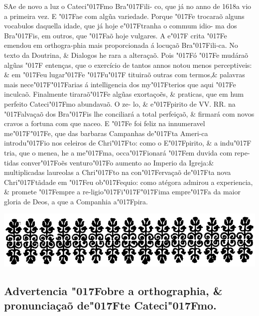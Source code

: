 \documentclass[openany,titlepage,12pt]{book}
\newcommand{\lgS}{\char"017F}
\newcommand{\lgSS}{\char"017F\char"017F}
\begin{document}
\lettrine[findent=2pt, nindent=0pt, lines=2]
{S}{A}e de novo a luz o Cateci\lgS mo Bra\lgS ili-\linebreak
co, que já no anno de 1618a vio a primeira vez. E \lgS ae
com algũa variedade. Porque \lgS e trocaraõ alguns vocabulos 
daquella idade, que já hoje e\lgS tranha o commum idio-
ma dos Bra\lgS is, em outros, que \lgS aõ hoje vulgares. A e\lgS 
crita \lgS e emendou em orthogra-phia mais proporcionada á 
locuçaõ Bra\lgS ili-ca. No texto da Doutrina, \& Dialogos he
rara a alteraçaõ. Pois \lgS ó \lgS e mudáraõ algũas \lgS 
entenças, que o exercício de tantos annos notou menos 
perceptiveis: \& em \lgS eu lugar\linebreak \lgS e \lgS u\lgS  
tituiraõ outras com termos,\& palavras mais nece\lgSS arias 
á intelligencia dos my\lgS terios que aqui \lgS e inculcaõ. 
Finalmente tiraraõ\lgS e  algũas exortaçoẽs, \& praticas, que em
hum perfeito Cateci\lgS mo abundavaõ. O ze-\linebreak
lo, \& e\lgS pirito
de VV. RR. na \lgS alvaçaõ dos Bra\lgS is lhe conciliará a 
total perfeiçaõ, \& firmará com novos cravos a fortuna com 
que naceo. E \lgS e foi feliz na innumeravel me\lgSS e, que 
das barbaras Campanhas de\lgS ta Ameri-ca introdu\lgS io nos
celeiros de Chri\lgS to: como o E\lgS pirito, \& a indu\lgS
tria, que o menea, he a me\lgS ma, occa\lgS ionará \lgS em 
duvida com repe-tidas conver\lgS oẽs venturo\lgS o aumento ao
Imperio da Igreja:\& multiplicadas laureolas a Chri\lgS to
na con\lgS ervaçaõ de\lgS ta nova Chri\lgS tãdade em \lgS eu
ob\lgS equio: como atégora admirou a experiencia, \& promete
\lgS empre a re-\linebreak ligio\lgS i\lgSS ima empre\lgS a da maior 
gloria de\linebreak
Deos, a que a Companhia a\lgS pira.
\newpage

\begin{center}
    \vspace*{12pt}
    \includegraphics[scale=0.24]{03-advertencias.png}
\end{center}
\unskip
\subsection{Advertencia \lgS obre a orthographia, \&
pronunciaçaõ de\lgS te Cateci\lgS mo.}
\end{document}
